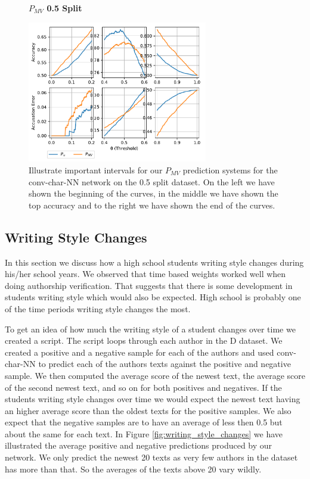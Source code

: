 \begin{description}
        \begin{figure}
            \centering
            \textbf{$P_{MV}$ 0.5 Split}\par\medskip
            \includegraphics[width=0.7\textwidth]{./pictures/discussion/conv_char_nn_prediction_zoom_50_majority_vote}
            \caption{Illustrate important intervals for our $P_{MV}$ prediction
                systems for the \gls{conv-char-NN} network on the 0.5 split
                dataset. On the left we have shown the beginning of the curves,
                in the middle we have shown the top accuracy and to the right we
                have shown the end of the curves.}
            \label{fig:conv_char_prediction_zoom_50_majority_vote}
        \end{figure}

\end{description}


\subsection{Writing Style Changes}

In this section we discuss how a high school students writing style changes
during his/her school years. We observed that time based weights worked well
when doing authorship verification. That suggests that there is some development
in students writing style which would also be expected. High school is probably
one of the time periods writing style changes the most.

To get an idea of how much the writing style of a student changes over time
we created a script. The script loops through each author in the \gls{D}
dataset. We created a positive and a negative sample for each of the authors
and used \gls{conv-char-NN} to predict each of the authors texts against
the positive and negative sample. We then computed the average score of the
newest text, the average score of the second newest text, and so on for both
positives and negatives. If the students writing style changes over time we
would expect the newest text having an higher average score than the oldest
texts for the positive samples. We also expect that the negative samples are to
have an average of less then 0.5 but about the same for each text. In Figure
\ref{fig:writing_style_changes} we have illustrated the average positive and
negative predictions produced by our network. We only predict the newest 20
texts as very few authors in the dataset has more than that. So the averages of
the texts above 20 vary wildly.

